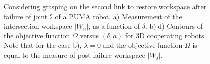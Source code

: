 \documentclass[12pt]{report}
\begin{document}
\begin{figure}
\begin{center}


\label{fig:objective3d}
\caption{Considering grasping on the second link to restore workspace after failure of joint 2 of a PUMA robot.  a) Measurement of the intersection workspace $|W_\cap|$, as a function of $\delta$. 
 b)-d) Contours of the objective function $\Omega$ versus $(\delta,a)$ for 3D cooperating robots. Note that for the case b), $\lambda=0$ and the objective function $\Omega$ is equal to the measure of post-failure workspace $|W_f|$. 
 }
\end{center}
\end{figure}
\end{document}
